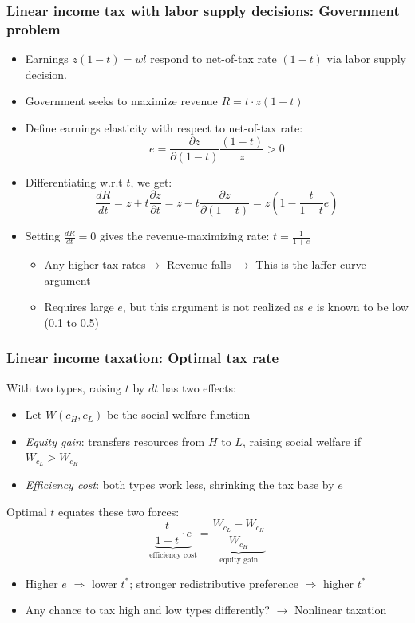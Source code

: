 \documentclass[aspectratio=169]{beamer}
\begin{document}
\begin{frame}
\frametitle{Linear income tax with labor supply decisions: Government problem}
\begin{itemize}\setlength\itemsep{3pt}
\item Earnings $z(1-t) = wl$ respond to net-of-tax rate $(1-t)$ via labor supply decision. 
\item Government seeks to maximize revenue $R=t\cdot z(1-t)$

\item Define earnings elasticity with respect to net-of-tax rate:
\[
e = \frac{\partial z}{\partial(1-t)}\frac{(1-t)}{z} > 0
\]
\item Differentiating w.r.t $t$, we get: 
\[
\frac{dR}{dt} = z + t\frac{\partial z}{\partial t} =z - t\frac{\partial z}{\partial (1-t)} = z\left(1 - \frac{t}{1-t}e\right)
\]
\item Setting $\frac{dR}{dt} = 0$ gives the revenue-maximizing rate: $t=\frac{1}{1+e}$
\begin{itemize}\setlength\itemsep{3pt}
\item Any higher tax rates$\to$ Revenue falls $\to$ This is the laffer curve argument
\item Requires large $e$, but this argument is not realized as $e$ is known to be low (0.1 to 0.5)
\end{itemize}
\end{itemize}
\end{frame}

\begin{frame}
\frametitle{Linear income taxation: Optimal tax rate}
 With two types, raising $t$ by $dt$ has two effects:
\begin{itemize}\setlength\itemsep{3pt}
  \item Let $W(c_H, c_L)$ be the social welfare function
    \item \textit{Equity gain}: transfers resources from $H$ to $L$, raising social welfare if $W_{c_L}>W_{c_H}$
    \item \textit{Efficiency cost}: both types work less, shrinking the tax base by $e$
\end{itemize}\medskip
Optimal $t$ equates these two forces:
\[
\underbrace{\frac{t}{1-t}\cdot e}_{\text{efficiency cost}} = \underbrace{\frac{W_{c_L}-W_{c_H}}{W_{c_H}}}_{\text{equity gain}}
\]
\begin{itemize}
\item Higher $e$ $\Rightarrow$ lower $t^*$; stronger redistributive preference $\Rightarrow$ higher $t^*$
\item Any chance to tax high and low types differently? $\to$ Nonlinear taxation 
\end{itemize}
\end{frame}
\end{document}
